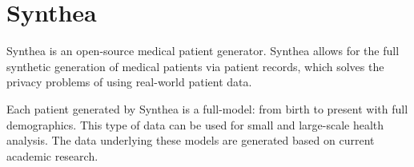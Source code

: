 \section{Synthea}

Synthea \cite{www-hid-sp18-526-synthea} is an open-source
medical patient generator. Synthea allows for the full synthetic
generation of medical patients via patient records, which solves
the privacy problems of using real-world patient data.

Each patient generated by Synthea is a full-model: from birth
to present with full demographics. This type of data can be used
for small and large-scale health analysis. The data underlying
these models are generated based on current academic research.
